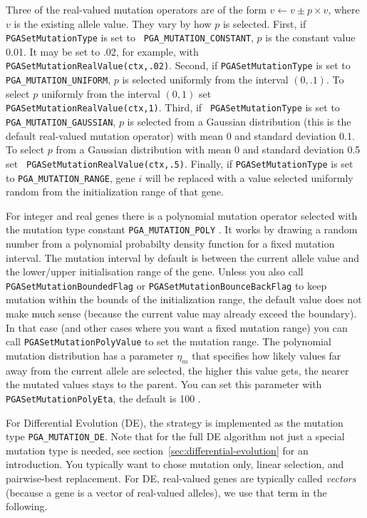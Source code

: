 \documentclass{report}
\begin{document}
Three of the real-valued mutation operators are of the form $v \leftarrow
v \pm p \times v$, where $v$ is the existing allele value.  They vary by how
$p$ is selected.  First, if {\tt PGASetMutationType} is set to {\tt
PGA\_MUTATION\_CONSTANT}, $p$ is the constant value 0.01. It may be set to
.02, for example, with {\tt PGASetMutationRealValue(ctx,.02)}.  Second, if
{\tt PGASetMutationType} is set to {\tt PGA\_MUTATION\_UNIFORM}, $p$ is
selected uniformly from the interval $(0,.1)$. To select $p$ uniformly from
the interval $(0,1)$ set {\tt PGASetMutationRealValue(ctx,1)}.  Third, if {\tt
PGASetMutationType} is set to {\tt PGA\_MUTATION\_GAUSSIAN}, $p$ is selected
from a Gaussian distribution (this is the default real-valued mutation
operator) with mean 0 and standard deviation 0.1.  To select $p$ from a
Gaussian distribution with mean 0 and standard deviation 0.5 set {\tt
PGASetMutationRealValue(ctx,.5)}.  Finally, if {\tt PGASetMutationType} is set
to {\tt PGA\_MUTATION\_RANGE}, gene $i$ will be replaced with a value selected
uniformly random from the initialization range of that gene.

For integer and real genes there is a polynomial mutation operator
selected with the mutation type constant \verb+PGA_MUTATION_POLY+
\cite{DG96}. It works by drawing a random number from a polynomial
probabilty density
function for a fixed mutation interval. The mutation interval by default
is between the current allele value and the lower/upper initialisation
range of the gene. Unless you also call \verb+PGASetMutationBoundedFlag+
or \verb+PGASetMutationBounceBackFlag+ to keep mutation within the
bounds of the initialization range, the default value does not make much
sense (because the current value may already exceed the boundary). In
that case (and other cases where you want a fixed mutation range) you
can call \verb+PGASetMutationPolyValue+ to set the mutation range. The
polynomial mutation distribution has a parameter $\eta_m$ that specifies how
likely values far away from the current allele are selected, the higher
this value gets, the nearer the mutated values stays to the parent. You
can set this parameter with \verb+PGASetMutationPolyEta+, the default is
100 \cite{DD14}.

\def\DefaultDEScaleFactor{0.9}
\def\DefaultDECrossoverProb{0.9}
\def\DefaultDEJitter{0.0}
\def\DefaultDEDither{0.0}
\def\DefaultDEProbabilityEO{0.5}
\def\DefaultDENumDiffs{1}

For Differential Evolution (DE), the strategy is implemented as the
mutation type \verb+PGA_MUTATION_DE+\label{mutation-de}. Note that for
the full DE algorithm not just a special mutation type is needed, see
section~\ref{sec:differential-evolution} for an introduction. You
typically want to chose mutation only, linear selection, and
pairwise-best replacement.
For DE, real-valued genes are typically called \textit{vectors} (because
a gene is a vector of real-valued alleles), we use that term in the
following.
\end{document}
